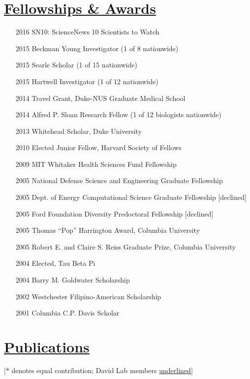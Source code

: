 \documentclass[overlapped,line,11pt]{res}
\begin{document}
\begin{resume}
\section{\underline{\sc Fellowships \& Awards}} 
\vspace{.25in}

\begin{itemize}[leftmargin=1cm, style=sameline, itemsep=0mm]
\item[2016] SN10: ScienceNews 10 Scientists to Watch
\item[2015] Beckman Young Investigator (1 of 8 nationwide)
\item[2015] Searle Scholar (1 of 15 nationwide)
\item[2015] Hartwell Investigator (1 of 12 nationwide)
\item[2014] Travel Grant, Duke-NUS Graduate Medical School
\item[2014] Alfred P. Sloan Research Fellow (1 of 12 biologists nationwide)
\item[2013] Whitehead Scholar, Duke University%
\item[2010] Elected Junior Fellow, Harvard Society of Fellows%
\item[2009] MIT Whitaker Health Sciences Fund Fellowship %
\item[2005] National Defense Science and Engineering Graduate
  Fellowship
\item[2005] Dept. of Energy Computational Science Graduate Fellowship [declined]
\item[2005] Ford Foundation Diversity Predoctoral Fellowship [declined]
\item[2005] Thomas ``Pop'' Harrington Award, Columbia University
\item[2005] Robert E. and Claire S. Reiss Graduate Prize, Columbia University
\item[2004] Elected, Tau Beta Pi
\item[2004] Barry M. Goldwater Scholarship
\item[2002] Westchester Filipino-American Scholarship
\item[2001] Columbia C.P. Davis Scholar

\end{itemize}

\section{\underline{\sc Publications}} 
\vspace{.1in}
$[\ast$ denotes equal
      contribution; David Lab members \underline{underlined}$]$
\vspace{.1in}


\end{resume}
\end{document}
